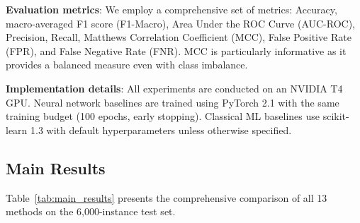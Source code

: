 \documentclass[journal,twoside]{IEEEtran}
\begin{document}
\textbf{Evaluation metrics}: We employ a comprehensive set of metrics: Accuracy, macro-averaged F1 score (F1-Macro), Area Under the ROC Curve (AUC-ROC), Precision, Recall, Matthews Correlation Coefficient (MCC), False Positive Rate (FPR), and False Negative Rate (FNR). MCC is particularly informative as it provides a balanced measure even with class imbalance.

\textbf{Implementation details}: All experiments are conducted on an NVIDIA T4 GPU. Neural network baselines are trained using PyTorch 2.1 with the same training budget (100 epochs, early stopping). Classical ML baselines use scikit-learn 1.3 with default hyperparameters unless otherwise specified.

\subsection{Main Results}

Table~\ref{tab:main_results} presents the comprehensive comparison of all 13 methods on the 6,000-instance test set.
\end{document}
